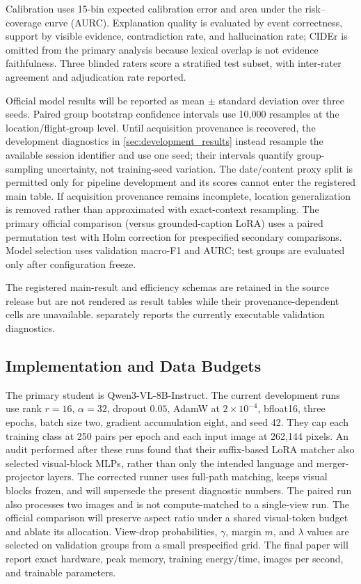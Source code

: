Calibration uses 15-bin expected calibration error and area under the risk--coverage curve (AURC). Explanation quality is evaluated by event correctness, support by visible evidence, contradiction rate, and hallucination rate; CIDEr is omitted from the primary analysis because lexical overlap is not evidence faithfulness. Three blinded raters score a stratified test subset, with inter-rater agreement and adjudication rate reported.

Official model results will be reported as mean $\pm$ standard deviation over three seeds. Paired group bootstrap confidence intervals use 10,000 resamples at the location/flight-group level. Until acquisition provenance is recovered, the development diagnostics in \cref{sec:development_results} instead resample the available session identifier and use one seed; their intervals quantify group-sampling uncertainty, not training-seed variation. The date/content proxy split is permitted only for pipeline development and its scores cannot enter the registered main table. If acquisition provenance remains incomplete, location generalization is removed rather than approximated with exact-context resampling. The primary official comparison (\method versus grounded-caption LoRA) uses a paired permutation test with Holm correction for prespecified secondary comparisons. Model selection uses validation macro-F1 and AURC; test groups are evaluated only after configuration freeze.

The registered main-result and efficiency schemas are retained in the source release but are not rendered as result tables while their provenance-dependent cells are unavailable.  separately reports the currently executable validation diagnostics.

\subsection{Implementation and Data Budgets}

The primary student is Qwen3-VL-8B-Instruct. The current development runs use rank $r=16$, $\alpha=32$, dropout $0.05$, AdamW at $2\times10^{-4}$, bfloat16, three epochs, batch size two, gradient accumulation eight, and seed 42. They cap each training class at 250 pairs per epoch and each input image at 262,144 pixels. An audit performed after these runs found that their suffix-based LoRA matcher also selected visual-block MLPs, rather than only the intended language and merger-projector layers. The corrected runner uses full-path matching, keeps visual blocks frozen, and will supersede the present diagnostic numbers. The paired run also processes two images and is not compute-matched to a single-view run. The official comparison will preserve aspect ratio under a shared visual-token budget and ablate its allocation. View-drop probabilities, $\gamma$, margin $m$, and $\lambda$ values are selected on validation groups from a small prespecified grid. The final paper will report exact hardware, peak memory, training energy/time, images per second, and trainable parameters.

